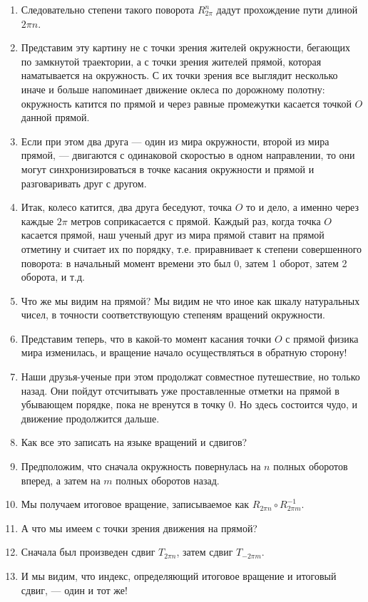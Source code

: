 \begin{enumerate}
\item Следовательно степени такого поворота $R_{2\pi}^n$ дадут прохождение пути длиной $2\pi n$.
\item Представим эту картину не с точки зрения жителей окружности, бегающих по замкнутой траектории, а с точки зрения жителей прямой, которая наматывается на окружность. С их точки зрения все выглядит несколько иначе и больше напоминает движение оклеса по дорожному полотну: окружность катится по прямой и через равные промежутки касается точкой $O$ данной прямой.
\item Если при этом два друга --- один из мира окружности, второй из мира прямой, --- двигаются с одинаковой скоростью в одном направлении, то они могут синхронизироваться в точке касания окружности и прямой и разговаривать друг с другом.
\item Итак, колесо катится, два друга беседуют, точка $O$ то и дело, а именно через каждые $2\pi$ метров соприкасается с прямой. Каждый раз, когда точка $O$ касается прямой, наш ученый друг из мира прямой ставит на прямой отметину и считает их по порядку, т.е. приравнивает к степени совершенного поворота: в начальный момент времени это был 0, затем 1 оборот, затем 2 оборота, и т.д.
\item Что же мы видим на прямой? Мы видим не что иное как шкалу натуральных чисел, в точности соответствующую степеням вращений окружности.
\item Представим теперь, что в какой-то момент касания точки $O$ с прямой физика мира изменилась, и вращение начало осуществляться в обратную сторону!
\item Наши друзья-ученые при этом продолжат совместное путешествие, но только назад. Они пойдут отсчитывать уже проставленные отметки на прямой в убывающем порядке, пока не вренутся в точку 0. Но здесь состоится чудо, и движение продолжится дальше.
\item Как все это записать на языке вращений и сдвигов?
\item Предположим, что сначала окружность повернулась на $n$ полных оборотов вперед, а затем на $m$ полных оборотов назад.
\item Мы получаем итоговое вращение, записываемое как $R_{2\pi n}\circ R_{2\pi m}^{-1}$.
\item А что мы имеем с точки зрения движения на прямой?
\item Сначала был произведен сдвиг $T_{2\pi n}$, затем сдвиг $T_{-2\pi m}$.
\item И мы видим, что индекс, определяющий итоговое вращение и итоговый сдвиг, --- один и тот же!

\end{enumerate}

